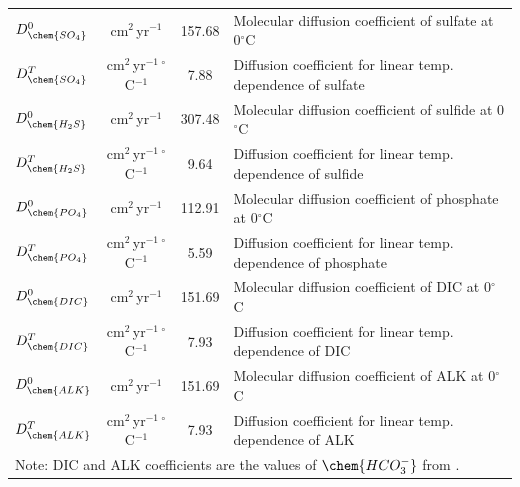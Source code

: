 \documentclass[gmd, manuscript]{copernicus}
\begin{document}
\begin{table}[hbtp]
\begin{tabular}{l c c l}
$D_{\chem{SO_4}}^0$ & cm$^2$\,yr$^{-1}$ & 157.68 &Molecular diffusion coefficient of sulfate at 0$^\circ$C\\
$D_{\chem{SO_4}}^T$ & cm$^2$\,yr$^{-1}$\,${}^{\circ}$C$^{-1}$ & 7.88 &Diffusion coefficient for linear temp. dependence of sulfate\\ %
$D_{\chem{H_2S}}^0$ & cm$^2$\,yr$^{-1}$ & 307.48 & Molecular diffusion coefficient of sulfide at 0$^\circ$C\\
$D_{\chem{H_2S}}^T$ & cm$^2$\,yr$^{-1}$\,${}^{\circ}$C$^{-1}$ & 9.64 & Diffusion coefficient for linear temp. dependence of sulfide\\ %
$D_{\chem{PO_4}}^0$ & cm$^2$\,yr$^{-1}$ & 112.91 &Molecular diffusion coefficient of phosphate at 0$^\circ$C\\
$D_{\chem{PO_4}}^T$ & cm$^2$\,yr$^{-1}$\,${}^{\circ}$C$^{-1}$ & 5.59 &Diffusion coefficient for linear temp. dependence of phosphate\\ %
$D_{\chem{DIC}}^0$ & cm$^2$\,yr$^{-1}$ & 151.69  &Molecular diffusion coefficient of DIC at 0$^\circ$C\\
$D_{\chem{DIC}}^T$ & cm$^2$\,yr$^{-1}$\,${}^{\circ}$C$^{-1}$ & 7.93  &Diffusion coefficient for linear temp. dependence of DIC\\ 
$D_{\chem{ALK}}^0$ & cm$^2$\,yr$^{-1}$ & 151.69  &Molecular diffusion coefficient of ALK at 0$^\circ$C\\
$D_{\chem{ALK}}^T$ & cm$^2$\,yr$^{-1}$\,${}^{\circ}$C$^{-1}$ & 7.93 &Diffusion coefficient for linear temp. dependence of ALK\\ 
\multicolumn{4}{l}{Note: DIC and ALK coefficients are the values of $\chem{HCO_3^{-}}$ from \citet{schulz_quantification_2006}.}\\
\hline\hline
\end{tabular}
\label{table:sed-charac_transport-parameters}
\end{table}
\end{document}
